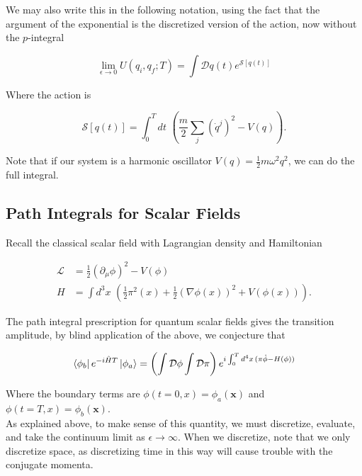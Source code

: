 \noindent We may also write this in the following notation, using the fact that the argument of the exponential is the discretized version of the action, now without the $p$-integral

\begin{equation}
\lim_{\epsilon \rightarrow 0} U(q_i, q_f; T) = \int \mathcal{D} q(t) e^{\mathcal{S}[q(t)]}
\end{equation}

\noindent Where the action is 

\begin{equation}
\mathcal{S}[q(t)] = \int^T_0 dt \,\, \left(\frac{m}{2} \sum_j (\dot{q}^j)^2 - V(q)\right).
\end{equation}

\noindent Note that if our system is a harmonic oscillator $V(q) = \frac{1}{2} m \omega^2 q^2$, we can do the full integral.

\subsection*{Path Integrals for Scalar Fields}

\noindent Recall the classical scalar field with Lagrangian density and Hamiltonian

\begin{align}
\mathcal{L} &= \frac{1}{2} (\partial_\mu \phi)^2 - V(\phi) \\
H &= \int d^3 x \,\, \left(\frac{1}{2} \pi^2(x) + \frac{1}{2} (\nabla \phi(x))^2 + V(\phi(x)) \right).
\end{align}

\noindent The path integral prescription for quantum scalar fields gives the transition amplitude, by blind application of the above, we conjecture that

\begin{equation}
\bra{\phi_b} e^{-i \hat{H} T} \ket{\phi_a} = \left( \int \mathcal{D} \phi \int \mathcal{D} \pi \right) e^{i \int^T_0 d^4x \, (\pi \dot{\phi} - H(\phi))}
\end{equation}

\noindent Where the boundary terms are $\phi(t=0, x) = \phi_a (\textbf{x})$ and $\phi(t=T, x) = \phi_b (\textbf{x})$. \\

\noindent As explained above, to make sense of this quantity, we must discretize, evaluate, and take the continuum limit as $\epsilon \rightarrow \infty$. When we discretize, note that we only discretize space, as discretizing time in this way will cause trouble with the conjugate momenta. \\

